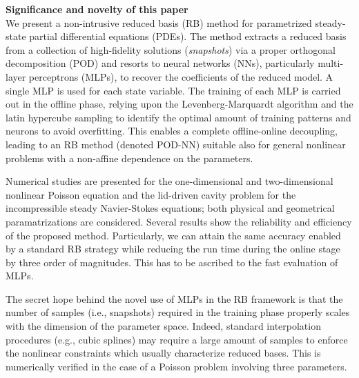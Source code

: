 \documentclass[11pt]{article}
\numberwithin{equation}{section}
\theoremstyle{theorem}
\theoremstyle{definition}
\theoremstyle{remark}
\theoremstyle{proposition}
\numberwithin{figure}{section}
\begin{document}
	
	\textbf{Significance and novelty of this paper} \\

	We present a non-intrusive reduced basis (RB) method for parametrized steady-state partial differential equations (PDEs). The method extracts a reduced basis from a collection of high-fidelity solutions (\emph{snapshots}) via a proper orthogonal decomposition (POD) and resorts to neural networks (NNs), particularly multi-layer perceptrons (MLPs), to recover the coefficients of the reduced model. A single MLP is used for each state variable. The training of each MLP is carried out in the offline phase, relying upon the Levenberg-Marquardt algorithm and the latin hypercube sampling to identify the optimal amount of training patterns and neurons to avoid overfitting. This enables a complete offline-online decoupling, leading to an RB method (denoted POD-NN) suitable also for general nonlinear problems with a non-affine dependence on the parameters. 

	Numerical studies are presented for the one-dimensional and two-dimensional nonlinear Poisson equation and the lid-driven cavity problem for the incompressible steady Navier-Stokes equations; both physical and geometrical paramatrizations are considered. Several results show the reliability and efficiency of the proposed method. Particularly, we can attain the same accuracy enabled by a standard RB strategy while reducing the run time during the online stage by three order of magnitudes. This has to be ascribed to the fast evaluation of MLPs. 

	The secret hope behind the novel use of MLPs in the RB framework is that the number of samples (i.e., snapshots) required in the training phase properly scales with the dimension of the parameter space. Indeed, standard interpolation procedures (e.g., cubic splines) may require a large amount of samples to enforce the nonlinear constraints which usually characterize reduced bases. This is numerically verified in the case of a Poisson problem involving three parameters. 
\end{document}
